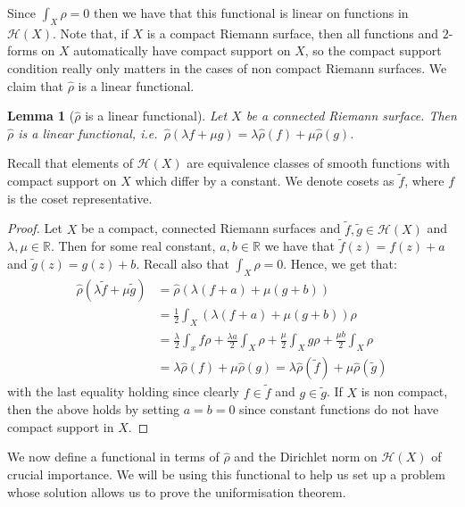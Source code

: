 \documentclass[11pt]{report}
\newtheorem{lemma}[thm]{Lemma}
\theoremstyle{definition}
\begin{document}
Since $\int_X \rho = 0$ then we have that this functional is linear on functions in $\mathcal{H}(X)$. Note that, if $X$ is a compact Riemann surface, then all functions and $2$-forms on $X$ automatically have compact support on $X$, so the compact support condition really only matters in the cases of non compact Riemann surfaces. We claim that $\hat{\rho}$ is a linear functional.
\begin{lemma}[$\hat{\rho}$ is a linear functional]\label{rhohatlinear}
  Let $X$ be a connected Riemann surface. Then $\hat{\rho}$ is a linear functional, i.e.\ $\hat{\rho}(\lambda f+ \mu g) = \lambda \hat{\rho}(f) + \mu \hat{\rho}(g)$.
\end{lemma}
Recall that elements of $\mathcal{H}(X)$ are equivalence classes of smooth functions with compact support on $X$ which differ by a constant. We denote cosets as $\tilde{f}$, where $f$ is the coset representative.
\begin{proof}
  Let $X$ be a compact, connected Riemann surfaces and $\tilde{f},\tilde{g} \in \mathcal{H}(X)$ and $\lambda,\mu \in \mathbb{R}$. Then for some real constant, $a,b \in \mathbb{R}$ we have that $\tilde{f}(z) = f(z) + a$ and $\tilde{g}(z) = g(z) + b$. Recall also that $\int_X \rho = 0$.
  Hence, we get that:
  \begin{align*}
    \hat{\rho}(\lambda \tilde{f}+ \mu \tilde{g}) &= \hat{\rho}(\lambda(f + a) + \mu(g + b)) \\
    &=\frac{1}{2}\int_X (\lambda(f + a) + \mu(g + b))\rho \\
    &=\frac{\lambda}{2} \int_x f\rho + \frac{\lambda a}{2}\int_X \rho + \frac{\mu}{2} \int_X g\rho + \frac{\mu b}{2}\int_X \rho \\
    &=\lambda \hat{\rho}(f) + \mu \hat{\rho}(g)=\lambda \hat{\rho}(\tilde{f}) + \mu \hat{\rho}(\tilde{g})
  \end{align*}
  with the last equality holding since clearly $f \in \tilde{f}$ and $g \in \tilde{g}$. If $X$ is non compact, then the above holds by setting $a=b=0$ since constant functions do not have compact support in $X$.
\end{proof}
We now define a functional in terms of $\hat{\rho}$ and the Dirichlet norm on $\mathcal{H}(X)$ of crucial importance. We will be using this functional to help us set up a problem whose solution allows us to prove the uniformisation theorem. 
\end{document}
